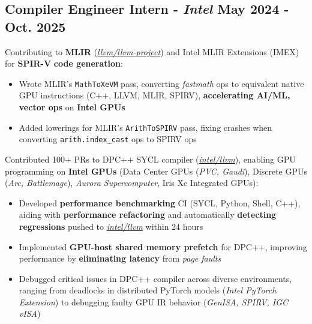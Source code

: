 \documentclass[9pt]{article}
\begin{document}
\subsection{Compiler Engineer Intern - \textit{Intel} \hfill \normalsize\textnormal{ May 2024 - Oct. 2025}} %
Contributing to \textbf{MLIR} (\href{https://github.com/llvm/llvm-project}{\textit{llvm/llvm-project}}) and Intel MLIR Extensions (IMEX) for \textbf{SPIR-V} \textbf{code generation}:
\vspace{-0.5em}
\begin{itemize}
  \item Wrote MLIR's \texttt{MathToXeVM} pass, converting \textit{fastmath} ops to equivalent native GPU instructions (C++, LLVM, MLIR, SPIRV), \textbf{accelerating AI/ML, vector ops} on \textbf{Intel GPUs} 
  \item Added lowerings for MLIR's \texttt{ArithToSPIRV} pass, fixing crashes when converting \texttt{arith.index\_cast} ops to SPIRV ops 
\end{itemize}
\vspace{-0.25em}
Contributed 100+ PRs to DPC++ SYCL compiler (\href{https://github.com/intel/llvm}{\textit{intel/llvm}}), enabling GPU programming on \textbf{Intel GPUs} (Data Center GPUs (\textit{PVC, Gaudi}), Discrete GPUs (\textit{Arc, Battlemage}), \textit{Aurora Supercomputer}, Iris Xe Integrated GPUs):
\vspace{-0.5em}
\begin{itemize}
  \item Developed \textbf{performance benchmarking} CI (SYCL, Python, Shell, C++), aiding with \textbf{performance refactoring} and automatically \textbf{detecting regressions} pushed to \href{https://github.com/intel/llvm}{\textit{intel/llvm}} within 24 hours
  \item Implemented \textbf{GPU-host shared memory prefetch} for DPC++, improving performance by \textbf{eliminating latency} from \textit{page faults}
  \item Debugged critical issues in DPC++ compiler across diverse environments, ranging from deadlocks in distributed PyTorch models (\textit{Intel PyTorch Extension}) to debugging faulty GPU IR behavior (\textit{GenISA, SPIRV, IGC vISA})
\end{itemize}
\vspace{-1em}
\end{document}
